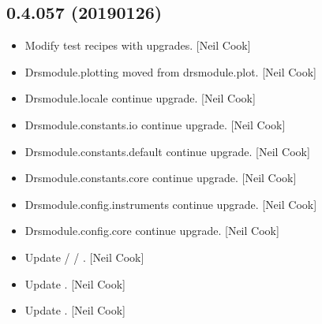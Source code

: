 \documentclass[a4paper,10pt,english]{report}
\begin{document}
\subsection{0.4.057 (2019\sphinxhyphen{}01\sphinxhyphen{}26)}
\label{\detokenize{misc/changelog:id226}}\begin{itemize}
\item {} 
Modify test recipes with upgrades. {[}Neil Cook{]}

\item {} 
Drsmodule.plotting \sphinxhyphen{} moved from drsmodule.plot. {[}Neil Cook{]}

\item {} 
Drsmodule.locale \sphinxhyphen{} continue upgrade. {[}Neil Cook{]}

\item {} 
Drsmodule.constants.io \sphinxhyphen{} continue upgrade. {[}Neil Cook{]}

\item {} 
Drsmodule.constants.default \sphinxhyphen{} continue upgrade. {[}Neil Cook{]}

\item {} 
Drsmodule.constants.core \sphinxhyphen{} continue upgrade. {[}Neil Cook{]}

\item {} 
Drsmodule.config.instruments \sphinxhyphen{} continue upgrade. {[}Neil Cook{]}

\item {} 
Drsmodule.config.core \sphinxhyphen{} continue upgrade. {[}Neil Cook{]}

\item {} 
Update  /  / . {[}Neil Cook{]}

\item {} 
Update . {[}Neil Cook{]}

\item {} 
Update . {[}Neil Cook{]}

\end{itemize}
\end{document}

